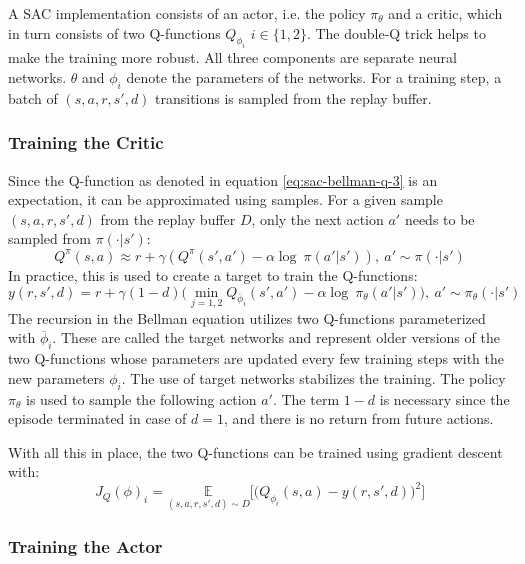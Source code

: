 A SAC implementation consists of an actor, i.e. the policy $\pi_\theta$ and a critic, which in turn consists of two Q-functions $Q_{\phi_i}$ $i \in \{1,2\}$. The double-Q trick helps to make the training more robust. All three components are separate neural networks. $\theta$ and $\phi_i$ denote the parameters of the networks. For a training step, a batch of $(s,a,r,s',d)$ transitions is sampled from the replay buffer.

\subsubsection{Training the Critic}
\label{sec:preliminaries:rl:sac-critic}
Since the Q-function as denoted in equation \ref{eq:sac-bellman-q-3} is an expectation, it can be approximated using samples. For a given sample $(s,a,r,s',d)$ from the replay buffer $D$, only the next action $a'$ needs to be sampled from $\pi(\cdot|s')$:
\begin{equation}
    Q^\pi(s,a) \approx r+\gamma(Q^\pi(s',a')-\alpha \log~ \pi(a'|s')),~ a'\sim\pi(\cdot|s')
    \label{eq:q-approx}
\end{equation}
In practice, this is used to create a target to train the Q-functions:
\begin{equation}
    y(r,s',d) = r+\gamma(1-d)\Big(\underset{j=1,2}{\min}Q_{\overline{\phi}_i}(s',a')-\alpha \log~ \pi_\theta(a'|s')\Big),~ a'\sim\pi_\theta(\cdot|s')
    \label{eq:q-target}
\end{equation}
The recursion in the Bellman equation utilizes two Q-functions parameterized with $\overline{\phi}_i$. These are called the target networks and represent older versions of the two Q-functions whose parameters are updated every few training steps with the new parameters $\phi_i$. The use of target networks stabilizes the training. The policy $\pi_\theta$ is used to sample the following action $a'$. The term $1-d$ is necessary since the episode terminated in case of $d=1$, and there is no return from future actions.

With all this in place, the two Q-functions can be trained using gradient descent with:
\begin{equation}
    J_Q(\phi)_i = \underset{(s,a,r,s',d)\sim D}{\mathbb{E}}\Big[\Big(Q_{\phi_i}(s,a)-y(r,s',d)\Big)^2\Big]
    \label{eq:critic-loss}
\end{equation}

\subsubsection{Training the Actor}
\label{sec:preliminaries:rl:sac-actor}

